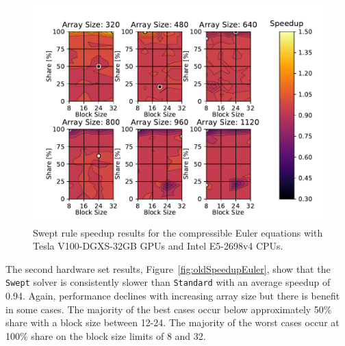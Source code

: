 \documentclass[journal,article,submit,moreauthors,pdftex]{Definitions/mdpi}
\def\Swept{\texttt{Swept}}
\def\Standard{\texttt{Standard}}
\newcommand\fs{1}
\def\newCPU{Intel E5-2698v4} %
\def\newGPU{Tesla V100-DGXS-32GB}
\begin{document}
\begin{figure}
    \widefigure
    \begin{center}
        \includegraphics[scale=\fs, trim={0.75cm 0.4cm 0.8cm 0.7cm},clip]{figs/speedUpeulerNew.pdf}
        \caption{Swept rule speedup results  for the compressible Euler equations with \newGPU{} GPUs and \newCPU{} CPUs.}
        \label{fig:newSpeedupEuler}
    \end{center}
\end{figure}
\begin{paracol}{2}
\linenumbers
\switchcolumn

The second hardware set results, Figure~\ref{fig:oldSpeedupEuler}, show that the \Swept{} solver is consistently slower than \Standard{} with an average speedup of 0.94. Again, performance declines with increasing array size but there is benefit in some cases. The majority of the best cases occur below approximately 50\% share with a block size between 12-24. The majority of the worst cases occur at 100\% share on the block size limits of 8 and 32.

\end{paracol}
\end{document}
